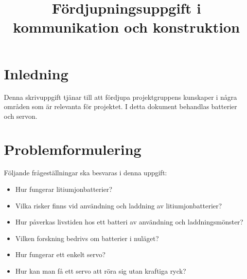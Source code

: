 \documentclass[a4paper,12pt]{article}
\title{Fördjupningsuppgift i kommunikation och konstruktion}
\renewcommand{\thepage}{\roman{page}}
\begin{document}
\LIPStitelsida

\begin{LIPSprojektidentitet}
\end{LIPSprojektidentitet}


\renewcommand*\contentsname{Innehåll}
\begin{spacing}{0.5}
\tableofcontents{}
\end{spacing}
\newpage

\begin{LIPSdokumenthistorik}
\end{LIPSdokumenthistorik}
\newpage

\renewcommand{\thepage}{\arabic{page}}
\setcounter{page}{1}

\section{Inledning}
Denna skrivuppgift tjänar till att fördjupa projektgruppens kunskaper i några områden som är relevanta för projektet. I detta dokument behandlas batterier och servon.

\section{Problemformulering}
Följande frågeställningar ska besvaras i denna uppgift:
\begin{itemize}
\item Hur fungerar litiumjonbatterier?

\item Vilka risker finns vid användning och laddning av litiumjonbatterier?

\item Hur påverkas livstiden hos ett batteri av användning och laddningsmönster?

\item Vilken forskning bedrivs om batterier i nuläget?

\item Hur fungerar ett enkelt servo?

\item Hur kan man få ett servo att röra sig utan kraftiga ryck?
\end{itemize}
\end{document}
